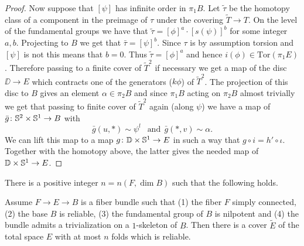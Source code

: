 \documentclass{amsart}
\begin{document}
\begin{proof}
Now suppose that $[\psi]$ has infinite order in $\pi_1B$. 
Let $\tilde\tau$ be the homotopy class of a component in the preimage of $\tau$ under the covering $\tilde T\to T$. 
On the level of  the fundamental groups we have that $\tilde\tau=[\phi]^a\cdot [s(\psi)]^b$ for some integer $a,b$. Projecting to $B$ we get that $\bar\tau=[\psi]^b$. Since $\tau$ is by assumption torsion and $[\psi]$ is not this means that $b=0$. Thus $\tilde\tau=[\phi]^a$ and hence
$i(\phi)\in \mathrm{Tor}(\pi_1E)$. 
Therefore passing to a finite cover of $\tilde T^2$ 
if necessary we get a map of the 
disc $\DD\to E$ which contracts one of the generators ($k \phi$) of $\tilde T^2$.
The projection of this disc to $B$ gives an element $\alpha\in \pi_2B$ 
and since $\pi_1B$ acting on $\pi_2B$ almost trivially we get 
that passing to finite cover of $\tilde T^2$ again (along $\psi$) we have a map of $\bar g\colon {\Bbb S}^2\times {\Bbb S}^1\to B$ with
$$ 
 \bar g(u,*)\sim\psi^l\ \ \text{ and}\ \ 
 \bar g(*,v)\sim\alpha.$$
We can lift this map to a map $g\colon \mathbb{D}\times {\Bbb S}^1\to E$ in such a way that $g\circ i=h'\circ \iota$. 
Together with the homotopy above, the latter gives the needed map of 
$\mathbb{D}\times {\Bbb S}^1\to E$.
\end{proof}

\begin{claim} 
There is a positive integer $n=n(F,\dim B)$ such that the following holds.

Assume $F\to E\to B$ 
is a fiber bundle such that
(1) the fiber $F$ simply connected, 
(2) the base $B$ is reliable,
(3) the fundamental group of $B$ is nilpotent and
(4) the bundle admits a trivialization on a $1$-skeleton of $B$.
Then there is a cover $\tilde E$ of the  total space $E$ with at most $n$ folds which is reliable.
\end{claim}
\end{document}

